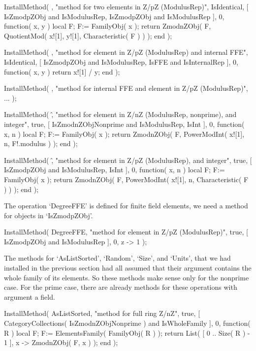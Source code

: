     InstallMethod( \/,
        "method for two elements in Z/pZ (ModulusRep)",
        IsIdentical,
        [ IsZmodpZObj and IsModulusRep,
          IsZmodpZObj and IsModulusRep ], 0,
        function( x, y )
        local F;
        F:= FamilyObj( x );
        return ZmodnZObj( F, QuotientMod( x![1], y![1],
                                          Characteristic( F ) ) );
        end );

    InstallMethod( \/,
        "method for element in Z/pZ (ModulusRep) and internal FFE",
        IsIdentical,
        [ IsZmodpZObj and IsModulusRep, IsFFE and IsInternalRep ], 0,
        function( x, y ) return x![1] / y; end );

    InstallMethod( \/,
        "method for internal FFE and element in Z/pZ (ModulusRep)",
        ... );

    InstallMethod( \^,
        "method for element in Z/nZ (ModulusRep, nonprime), and integer",
        true,
        [ IsZmodnZObjNonprime and IsModulusRep, IsInt ], 0,
        function( x, n )
        local F;
        F:= FamilyObj( x );
        return ZmodnZObj( F, PowerModInt( x![1], n, F!.modulus ) );
        end );

    InstallMethod( \^,
        "method for element in Z/pZ (ModulusRep), and integer",
        true,
        [ IsZmodpZObj and IsModulusRep, IsInt ], 0,
        function( x, n )
        local F;
        F:= FamilyObj( x );
        return ZmodnZObj( F, PowerModInt( x![1], n,
                                          Characteristic( F ) ) );
        end );
\endexample

The operation `DegreeFFE' is defined for finite field elements,
we need a method for objects in `IsZmodpZObj'.

\beginexample
    InstallMethod( DegreeFFE,
        "method for element in Z/pZ (ModulusRep)",
        true,
        [ IsZmodpZObj and IsModulusRep ], 0,
        z -> 1 );
\endexample

The methods for `AsListSorted', `Random', `Size', and `Units',
that we had installed in the previous section had all assumed that
their argument contains the whole family of its elements.
So these methods make sense only for the nonprime case.
For the prime case, there are already methods for these operations
with argument a field.

\beginexample
    InstallMethod( AsListSorted,
        "method for full ring Z/nZ",
        true,
        [ CategoryCollections( IsZmodnZObjNonprime ) and IsWholeFamily ],
        0,
        function( R )
        local F;
        F:= ElementsFamily( FamilyObj( R ) );
        return List( [ 0 .. Size( R ) - 1 ], x -> ZmodnZObj( F, x ) );
        end );

